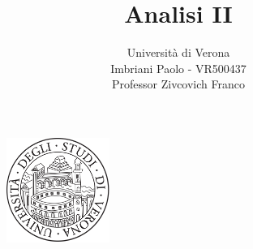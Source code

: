 


\title{Analisi II}
\author{Università di Verona\\Imbriani Paolo - VR500437\\Professor Zivcovich Franco}


\begin{figure}
    \centering
    \includegraphics[width=0.3\textwidth]{UniversityofVerona.png}
\end{figure}

\maketitle 

\pagebreak

\tableofcontents

\pagebreak


